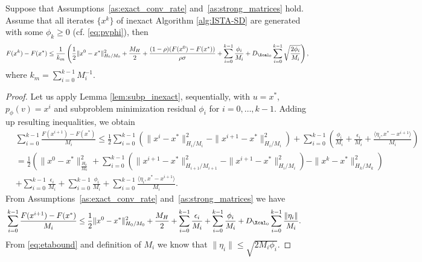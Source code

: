 \documentclass[11pt]{article}
\numberwithin{equation}{section}
\begin{document}
  \begin{theorem}\label{th:inexact_conv_rate}
 Suppose that Assumptions~\ref{as:exact_conv_rate} and~\ref{as:strong_matrices} hold. 
 Assume that all iterates $\{x^k\}$ of inexact Algorithm \ref{alg:ISTA-SD} are generated with some $\phi_k\geq 0$ (cf. \eqref{eq:pvphi}), then
 \begin{align}
     \label{eq:bound_F_F*}
     F(x^k) - F(x^*) \leq 
     \frac{1}{k_m} \left( \frac{1}{2} \|x^0-x^*\|_{H_0/M_0}^2 
     + \frac{M_H}{2}+ \frac{(1-\rho)(F(x^0)-F(x^*))}{\rho\sigma} 
     + \sum_{i=0}^{k-1}\frac{\phi_i}{M_i}
     + D_{\Xcal_0}\sum_{i=0}^{k-1} \sqrt{\frac{2\phi_i}{M_i}} \right),
 \end{align}
 where $k_m=\sum_{i=0}^{k-1}M_i^{-1}$.
 \end{theorem}


 \begin{proof}
     Let us apply Lemma \ref{lem:subp_inexact}, sequentially, with $u=x^*$, $p_{\phi}(v)=x^i$ and subproblem minimization residual $\phi_i$ for $i=0, \ldots, k-1$. Adding up resulting inequalities, we obtain  
     \begin{align}
         &\sum_{i=0}^{k-1} \frac{F(x^{i+1}) - F(x^*)}{M_i}\leq 
         \frac{1}{2} \sum_{i=0}^{k-1} \left(\|x^i-x^*\|_{H_i/M_i}^2 
         - \|x^{i+1}-x^*\|_{H_i/M_i}^2 \right) 
         + \sum_{i=0}^{k-1}( \frac{\phi_i}{M_i} + \frac{\epsilon_i}{M_i} +\frac{\langle \eta_i,x^* - x^{i+1} \rangle}{M_i})\nonumber \\
         \label{equ:bound_F_diff}
         &= 
          \frac{1}{2} \left( \|x^0-x^*\|_{\frac{H_0}{M_0}}^2 
         + \sum_{i=0}^{k-1}(\|x^{i+1} - x^*\|^2_{H_{i+1}/M_{i+1}}-\|x^{i+1} - x^*\|^2_{H_i/M_i})
         - \|x^k-x^*\|_{H_k/M_k}^2 \right) \\
         &\nonumber + \sum_{i=0}^{k-1} \frac{\epsilon_i}{M_i} 
         + \sum_{i=0}^{k-1} \frac{\phi_i}{M_i} 
         + \sum_{i=0}^{k-1} \frac{\langle \eta_i,x^* - x^{i+1} \rangle}{M_i}.
         \end{align}
         From Assumptions~\ref{as:exact_conv_rate} and~\ref{as:strong_matrices} we have
         \begin{align*}
         &\sum_{i=0}^{k-1} \frac{F(x^{i+1}) - F(x^*)}{M_i} \leq 
         \frac{1}{2} \|x^0-x^*\|_{H_0/M_0}^2 +\frac{M_H}{2}
         + \sum_{i=0}^{k-1} \frac{\epsilon_i}{M_i} 
         + \sum_{i=0}^{k-1} \frac{\phi_i}{M_i} 
         + D_{\Xcal_0}\sum_{i=0}^{k-1} \frac{\|\eta_i\|}{M_i}. 
         \end{align*}
         From \eqref{eq:etabound}  and definition of $M_i$ we know that $\|\eta_i\|\leq \sqrt{2M_i\phi_i}$. 

\end{proof}
\end{document}
